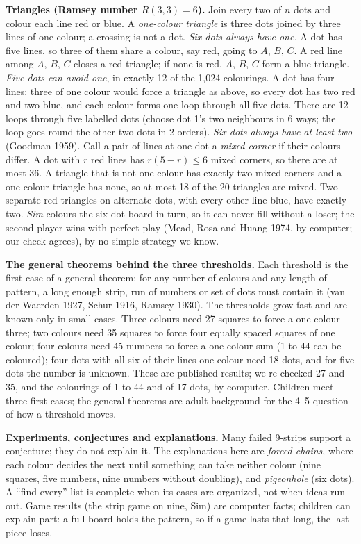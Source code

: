 \documentclass[11pt]{article}
\begin{document}
\textbf{Triangles (Ramsey number $R(3,3)=6$).} Join every two of $n$ dots and colour each line red or blue. A \emph{one-colour triangle} is three dots joined by three lines of one colour; a crossing is not a dot. \emph{Six dots always have one.} A dot has five lines, so three of them share a colour, say red, going to $A$, $B$, $C$. A red line among $A$, $B$, $C$ closes a red triangle; if none is red, $A$, $B$, $C$ form a blue triangle. \emph{Five dots can avoid one}, in exactly 12 of the 1,024 colourings. A dot has four lines; three of one colour would force a triangle as above, so every dot has two red and two blue, and each colour forms one loop through all five dots. There are 12 loops through five labelled dots (choose dot 1's two neighbours in 6 ways; the loop goes round the other two dots in 2 orders). \emph{Six dots always have at least two} (Goodman 1959). Call a pair of lines at one dot a \emph{mixed corner} if their colours differ. A dot with $r$ red lines has $r(5-r)\le6$ mixed corners, so there are at most 36. A triangle that is not one colour has exactly two mixed corners and a one-colour triangle has none, so at most 18 of the 20 triangles are mixed. Two separate red triangles on alternate dots, with every other line blue, have exactly two. \emph{Sim} colours the six-dot board in turn, so it can never fill without a loser; the second player wins with perfect play (Mead, Rosa and Huang 1974, by computer; our check agrees), by no simple strategy we know.

\textbf{The general theorems behind the three thresholds.} Each threshold is the first case of a general theorem: for any number of colours and any length of pattern, a long enough strip, run of numbers or set of dots must contain it (van der Waerden 1927, Schur 1916, Ramsey 1930). The thresholds grow fast and are known only in small cases. Three colours need 27 squares to force a one-colour three; two colours need 35 squares to force four equally spaced squares of one colour; four colours need 45 numbers to force a one-colour sum (1 to 44 can be coloured); four dots with all six of their lines one colour need 18 dots, and for five dots the number is unknown. These are published results; we re-checked 27 and 35, and the colourings of 1 to 44 and of 17 dots, by computer. Children meet three first cases; the general theorems are adult background for the 4--5 question of how a threshold moves.

\textbf{Experiments, conjectures and explanations.} Many failed 9-strips support a conjecture; they do not explain it. The explanations here are \emph{forced chains}, where each colour decides the next until something can take neither colour (nine squares, five numbers, nine numbers without doubling), and \emph{pigeonhole} (six dots). A ``find every'' list is complete when its cases are organized, not when ideas run out. Game results (the strip game on nine, Sim) are computer facts; children can explain part: a full board holds the pattern, so if a game lasts that long, the last piece loses.
\end{document}
